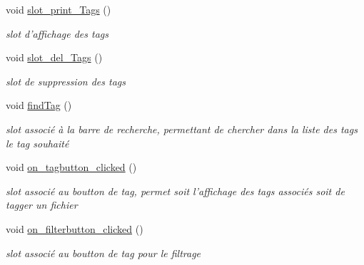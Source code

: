 \begin{DoxyCompactItemize}
\item 
\hypertarget{classtaglayout_ab885eac00ae5dabf14d05ad0466f8c40}{void \hyperlink{classtaglayout_ab885eac00ae5dabf14d05ad0466f8c40}{slot\-\_\-print\-\_\-\-Tags} ()}\label{classtaglayout_ab885eac00ae5dabf14d05ad0466f8c40}

\begin{DoxyCompactList}\small\item\em slot d'affichage des tags \end{DoxyCompactList}\item 
\hypertarget{classtaglayout_adc394329955e8887115f05a85377f940}{void \hyperlink{classtaglayout_adc394329955e8887115f05a85377f940}{slot\-\_\-del\-\_\-\-Tags} ()}\label{classtaglayout_adc394329955e8887115f05a85377f940}

\begin{DoxyCompactList}\small\item\em slot de suppression des tags \end{DoxyCompactList}\item 
\hypertarget{classtaglayout_ae21bbf293ba198e7876d7e5427d80852}{void \hyperlink{classtaglayout_ae21bbf293ba198e7876d7e5427d80852}{find\-Tag} ()}\label{classtaglayout_ae21bbf293ba198e7876d7e5427d80852}

\begin{DoxyCompactList}\small\item\em slot associé à la barre de recherche, permettant de chercher dans la liste des tags le tag souhaité \end{DoxyCompactList}\item 
\hypertarget{classtaglayout_ad1b120e1f0c5677577a579e648fe8a9e}{void \hyperlink{classtaglayout_ad1b120e1f0c5677577a579e648fe8a9e}{on\-\_\-tagbutton\-\_\-clicked} ()}\label{classtaglayout_ad1b120e1f0c5677577a579e648fe8a9e}

\begin{DoxyCompactList}\small\item\em slot associé au boutton de tag, permet soit l'affichage des tags associés soit de tagger un fichier \end{DoxyCompactList}\item 
\hypertarget{classtaglayout_a5bab3aa8a1c75f04e73bf0644e74cf1c}{void \hyperlink{classtaglayout_a5bab3aa8a1c75f04e73bf0644e74cf1c}{on\-\_\-filterbutton\-\_\-clicked} ()}\label{classtaglayout_a5bab3aa8a1c75f04e73bf0644e74cf1c}

\begin{DoxyCompactList}\small\item\em slot associé au boutton de tag pour le filtrage \end{DoxyCompactList}\end{DoxyCompactItemize}
